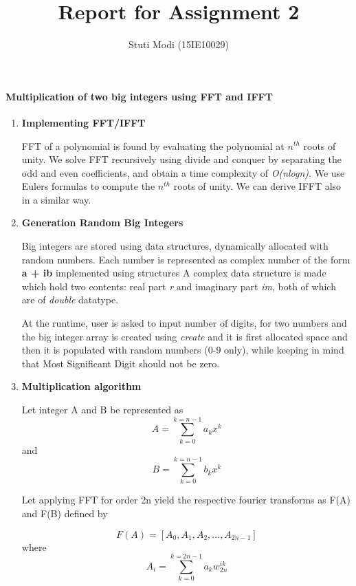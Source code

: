 \documentclass[a4paper,11pt]{article}
\title{Report for Assignment 2}
\author{Stuti Modi (15IE10029)}
\begin{document}
\maketitle

\paragraph{Multiplication of two big integers using FFT and IFFT}
\begin{enumerate}
 \item \textbf{Implementing FFT/IFFT}

FFT of a polynomial is found by evaluating the polynomial at $n^{th}$ roots of unity. We solve FFT recursively using divide and conquer by separating the odd and even coefficients, and obtain a time complexity of \emph{O(nlogn)}. We use Eulers formulas to compute the $n^{th}$ roots of unity. We can derive IFFT also in a similar way.

\item \textbf{Generation Random Big Integers}

Big integers are stored using data structures, dynamically allocated with random numbers.
Each number is represented as complex number of the form \textbf{a + ib} implemented using structures
A complex data structure is made which hold two contents: real part \emph{r} and imaginary part \emph{im}, both of which are of \emph{double} datatype.

At the runtime, user is asked to input number of digits, for two numbers and the big integer array is created using \emph{create} and it is first allocated space and then it is populated with random numbers (0-9 only), while keeping in mind that Most Significant Digit should not be zero.

\item \textbf{Multiplication algorithm}

Let integer A and B be represented as
\begin{equation}
A = \sum_{k=0}^{k=n-1} a_{k}x^k
\end{equation}
and 
\begin{equation}
B = \sum_{k=0}^{k=n-1} b_{k}x^k
\end{equation}

Let applying FFT for order 2n yield the respective fourier transforms as F(A) and F(B) defined by

\begin{equation}
F(A) = [A_{0}, A_{1}, A_{2}, ..., A_{2n-1}]\end{equation} where \begin{equation}
A_i = \sum_{k=0}^{k=2n-1} a_{k}w_{2n}^{ik}\end{equation}


\end{enumerate}
\end{document}
